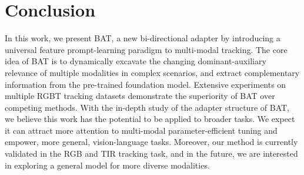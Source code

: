 \documentclass[letterpaper]{article} %
\begin{document}
\section{Conclusion}

In this work, we present BAT, a new bi-directional adapter by introducing a universal feature prompt-learning paradigm to multi-modal tracking. 
The core idea of BAT is to dynamically excavate the changing dominant-auxiliary relevance of multiple modalities in complex scenarios, and extract complementary information from the pre-trained foundation model.
Extensive experiments on multiple RGBT tracking datasets demonstrate the superiority of BAT over competing methods. With the in-depth study of the adapter structure of BAT, we believe this work has the potential to be applied to broader tasks. We expect it can attract more attention to multi-modal parameter-efficient tuning and empower, more general, vision-language tasks. Moreover, our method is currently validated in the RGB and TIR tracking task, and in the future, we are interested in exploring a general model for more diverse modalities.









\end{document}
